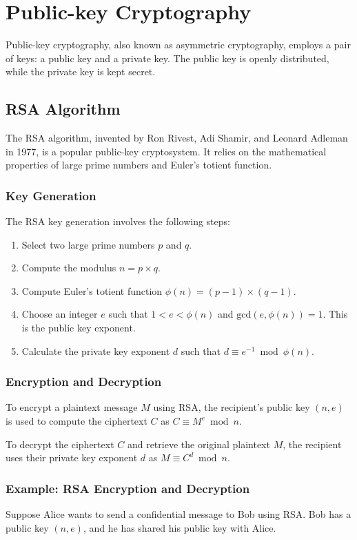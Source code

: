\documentclass{article}
\begin{document}
\section{Public-key Cryptography}
Public-key cryptography, also known as asymmetric cryptography, employs a pair of keys: a public key and a private key. The public key is openly distributed, while the private key is kept secret.

\subsection{RSA Algorithm}
The RSA algorithm, invented by Ron Rivest, Adi Shamir, and Leonard Adleman in 1977, is a popular public-key cryptosystem. It relies on the mathematical properties of large prime numbers and Euler's totient function.

\subsubsection{Key Generation}
The RSA key generation involves the following steps:
\begin{enumerate}
    \item Select two large prime numbers $p$ and $q$.
    \item Compute the modulus $n = p \times q$.
    \item Compute Euler's totient function $\phi(n) = (p-1) \times (q-1)$.
    \item Choose an integer $e$ such that $1 < e < \phi(n)$ and $\text{gcd}(e, \phi(n)) = 1$. This is the public key exponent.
    \item Calculate the private key exponent $d$ such that $d \equiv e^{-1} \bmod \phi(n)$.
\end{enumerate}

\subsubsection{Encryption and Decryption}
To encrypt a plaintext message $M$ using RSA, the recipient's public key $(n, e)$ is used to compute the ciphertext $C$ as $C \equiv M^e \bmod n$.

To decrypt the ciphertext $C$ and retrieve the original plaintext $M$, the recipient uses their private key exponent $d$ as $M \equiv C^d \bmod n$.

\subsubsection{Example: RSA Encryption and Decryption}
Suppose Alice wants to send a confidential message to Bob using RSA. Bob has a public key $(n, e)$, and he has shared his public key with Alice.
\end{document}
